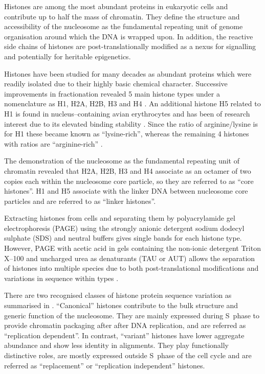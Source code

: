 \documentclass[10pt,a4paper,onecolumn,article]{memoir}
\begin{document}
    Histones are among the most abundant proteins in eukaryotic cells and contribute up
    to half the mass of chromatin. They define the structure and accessibility of the
    nucleosome as the fundamental repeating unit of genome organisation around which
    the DNA is wrapped upon. In addition, the reactive
    side chains of histones are post-translationally modified as a nexus for signalling
    and potentially for heritable epigenetics.

    Histones have been studied for many decades as abundant proteins which were readily
    isolated due to their highly basic chemical character. Successive improvements in
    fractionation revealed 5 main histone types under a nomenclature as H1, H2A, H2B, H3
    and H4 \citep{nomenclature}. An additional histone H5 related to H1 is found in
    nucleus--containing avian erythrocytes and has been of research interest due to its
    elevated binding stability \citep{HFive-review}.
    Since the ratio of arginine/lysine is \LinkerArgLysRatio{}
    for H1 these became known as ``lysine-rich'', whereas the remaining 4 histones with
    ratios \CoreArgLysRatio{} are ``arginine-rich'' .

    The demonstration of the nucleosome as the fundamental repeating unit of chromatin revealed
    that H2A, H2B, H3 and H4 associate as an octamer of two copies each within the
    nucleosome core particle, so they are referred to as ``core histones''. H1 and H5
    associate with the linker DNA between nucleosome core particles and are referred to
    as ``linker histones''.

    Extracting histones from cells and separating them by polyacrylamide gel electrophoresis
    (PAGE) using the strongly anionic detergent sodium dodecyl sulphate (SDS) and neutral
    buffers gives single bands for each histone type. However, PAGE with acetic acid in gels
    containing the non-ionic detergent Triton X--100 and uncharged urea as denaturants
    (TAU or AUT) allows the separation of histones into multiple species due to both
    post-translational modifications and variations in sequence within types \citep{PAGEND}.

    There are two recognised classes of histone protein sequence variation as summarised
    in . ``Canonical'' histones contribute to the
    bulk structure and generic function of the nucleosome. They are mainly expressed
    during S~phase to provide chromatin packaging after after DNA replication,
    and are referred as ``replication dependent''. In contrast, ``variant'' histones
    have lower aggregate abundance and show less identity in alignments. They play
    functionally distinctive roles, are mostly expressed outside S~phase of the cell
    cycle and are referred as ``replacement'' or ``replication independent'' histones.
\end{document}
